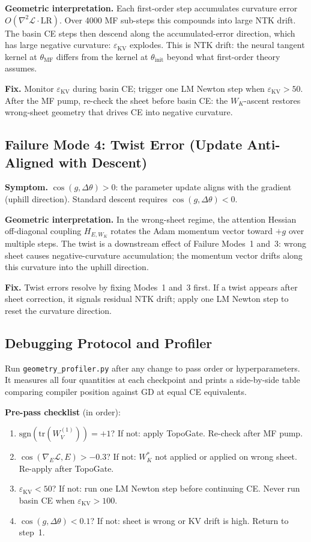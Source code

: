 \documentclass[11pt]{amsart}
\begin{document}
\textbf{Geometric interpretation.}
Each first-order step accumulates curvature error $O(\nabla^2\mathcal{L}
\cdot \mathrm{LR})$.
Over 4000 MF sub-steps this compounds into large NTK drift.
The basin CE steps then descend along the accumulated-error direction,
which has large negative curvature: $\varepsilon_\mathrm{KV}$ explodes.
This is NTK drift: the neural tangent kernel at $\theta_\mathrm{MF}$
differs from the kernel at $\theta_\mathrm{init}$ beyond what first-order
theory assumes.

\textbf{Fix.}
Monitor $\varepsilon_\mathrm{KV}$ during basin CE; trigger one LM
Newton step when $\varepsilon_\mathrm{KV} > 50$.
After the MF pump, re-check the sheet before basin CE: the $W_K$-ascent
restores wrong-sheet geometry that drives CE into negative curvature.

\subsection{Failure Mode 4: Twist Error (Update Anti-Aligned with Descent)}

\textbf{Symptom.}
$\cos(g, \Delta\theta) > 0$: the parameter update aligns with the
gradient (uphill direction).
Standard descent requires $\cos(g,\Delta\theta) < 0$.

\textbf{Geometric interpretation.}
In the wrong-sheet regime, the attention Hessian off-diagonal coupling
$H_{E,W_K}$ rotates the Adam momentum vector toward $+g$ over multiple
steps.
The twist is a downstream effect of Failure Modes~1 and~3:
wrong sheet causes negative-curvature accumulation; the momentum
vector drifts along this curvature into the uphill direction.

\textbf{Fix.}
Twist errors resolve by fixing Modes~1 and~3 first.
If a twist appears after sheet correction, it signals residual NTK
drift; apply one LM Newton step to reset the curvature direction.

\subsection{Debugging Protocol and Profiler}

Run \texttt{geometry\_profiler.py} after any change to pass order or
hyperparameters. It measures all four quantities at each checkpoint
and prints a side-by-side table comparing compiler position against
GD at equal CE equivalents.

\medskip
\noindent\textbf{Pre-pass checklist} (in order):
\begin{enumerate}
  \item $\mathrm{sgn}(\mathrm{tr}(W_V^{(1)})) = +1$? If not: apply TopoGate.
        Re-check after MF pump.
  \item $\cos(\nabla_E\mathcal{L}, E) > -0.3$? If not: $W_K^*$ not applied
        or applied on wrong sheet. Re-apply after TopoGate.
  \item $\varepsilon_\mathrm{KV} < 50$? If not: run one LM Newton step
        before continuing CE. Never run basin CE when
        $\varepsilon_\mathrm{KV} > 100$.
  \item $\cos(g,\Delta\theta) < 0.1$? If not: sheet is wrong or KV drift
        is high. Return to step~1.
\end{enumerate}
\end{document}
